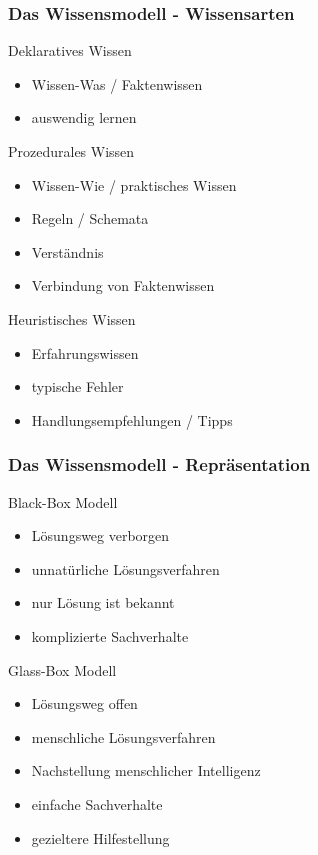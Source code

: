 \documentclass{beamer}
\begin{document}
\begin{frame}
  \frametitle{Das Wissensmodell - Wissensarten}
  \begin{block}{Deklaratives Wissen}
    \begin{itemize}
      \item Wissen-Was / Faktenwissen
      \item auswendig lernen
    \end{itemize}
  \end{block}

  \begin{block}{Prozedurales Wissen}
    \begin{itemize}
      \item Wissen-Wie / praktisches Wissen
      \item Regeln / Schemata
      \item Verständnis
      \item Verbindung von Faktenwissen
    \end{itemize}
  \end{block}

  \begin{block}{Heuristisches Wissen}
    \begin{itemize}
      \item Erfahrungswissen
      \item typische Fehler
      \item Handlungsempfehlungen / Tipps
    \end{itemize}
  \end{block}
\end{frame}

\begin{frame}
  \frametitle{Das Wissensmodell - Repräsentation}
  \begin{block}{Black-Box Modell}
    \begin{itemize}
      \item Lösungsweg verborgen
      \item unnatürliche Lösungsverfahren
      \item nur Lösung ist bekannt
      \item komplizierte Sachverhalte
    \end{itemize}
  \end{block}

  \begin{block}{Glass-Box Modell}
    \begin{itemize}
      \item Lösungsweg offen
      \item menschliche Lösungsverfahren
      \item Nachstellung menschlicher Intelligenz
      \item einfache Sachverhalte
      \item gezieltere Hilfestellung
    \end{itemize}
  \end{block}
\end{frame}
\end{document}
